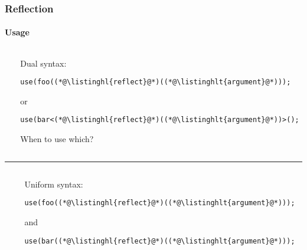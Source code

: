 \documentclass[compress,table,xcolor=table]{beamer}
\begin{document}
\begin{frame}[fragile]
  \frametitle{Reflection}
  \framesubtitle{Usage}
  \begin{columns}
    \begin{column}{.05\textwidth}
    \end{column}
    \begin{column}{.85\textwidth}
    \normalsize
    Dual syntax:
    \begin{lstlisting}[language=c++2x,basicstyle=\normalsize\ttfamily]
use(foo((*@\listinghl{reflect}@*)((*@\listinghlt{argument}@*)));
    \end{lstlisting}
    or
    \begin{lstlisting}[language=c++2x,basicstyle=\normalsize\ttfamily]
use(bar<(*@\listinghl{reflect}@*)((*@\listinghlt{argument}@*))>();
    \end{lstlisting}
    When to use which?
    \end{column}
  \end{columns}
  \vfill
  \hrule
  \vfill
  \begin{columns}
    \begin{column}{.05\textwidth}
    \end{column}
    \begin{column}{.85\textwidth}
    \normalsize
    Uniform syntax:
    \begin{lstlisting}[language=c++2x,basicstyle=\normalsize\ttfamily]
use(foo((*@\listinghl{reflect}@*)((*@\listinghlt{argument}@*)));
    \end{lstlisting}
    and
    \begin{lstlisting}[language=c++2x,basicstyle=\normalsize\ttfamily]
use(bar((*@\listinghl{reflect}@*)((*@\listinghlt{argument}@*)));
    \end{lstlisting}
    \end{column}
  \end{columns}
\end{frame}
\end{document}
